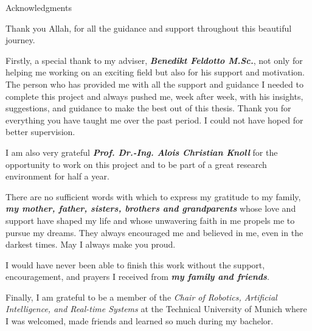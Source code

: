 \thispagestyle{empty}

\vspace*{10mm}

\begin{center}
{ Acknowledgments}
\end{center}

\vspace{5mm}

\begin{center}
Thank you Allah, for all the guidance and support throughout this beautiful journey.
\end{center} 


Firstly, a special thank to my adviser, \textit{\textbf{Benedikt Feldotto M.Sc.}}, not only for helping me working on an exciting field but also for his support and motivation. The person who has provided me with all the support and guidance I needed to complete this project and always pushed me, week after week, with his insights, suggestions, and guidance to make the best out of this thesis. Thank you for everything you have taught me over the past period. I could not have hoped for better supervision.

I am also very grateful \textit{\textbf{Prof. Dr.-Ing. Alois Christian Knoll}} for the opportunity to work on this project and to be part of a great research environment for half a year.

There are no sufficient words with which to express my gratitude to my family, \textit{\textbf{my mother, father, sisters, brothers and grandparents}} whose love and support have shaped my life and whose unwavering faith in me propels me to pursue my dreams. They always encouraged me and believed in me, even in the darkest times. May I always make you proud.

I would have never been able to finish this work without the support, encouragement, and prayers I received from \textit{\textbf{my family and friends}}.

Finally, I am grateful to be a member of the \textit{Chair of Robotics, Artificial Intelligence, and Real-time Systems} at the Technical University of Munich where I was welcomed, made friends and learned so much during my bachelor.